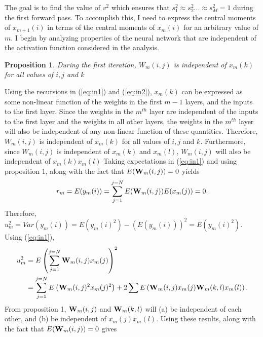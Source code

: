 \documentclass[a4paper]{article}
\newcommand{\enum}[1]{\label{eq:#1}}
\newcommand{\eref}[1]{(\ref {eq:#1})}
\newcommand{\be}{\begin{equation}}
\newcommand{\ee}{\end{equation}}
\newtheorem{prop}{Proposition}
\begin{document}
The goal is to find the value of $v^{2}$  which ensures that $s_{1}^{2} \approx s_{2}^{2} ...\approx s_{M}^{2} = 1$ during the first forward pass. To accomplish this, I need to express the  central moments of $x_{m+1}(i)$ in terms of the central moments of $x_{m}(i)$ for an arbitrary value of $m$. I begin by analyzing properties of the neural network that are independent of the activation function considered in the analysis.
\begin{prop}
During the first iteration, $W_{m}(i,j)$ is independent of $x_{m}(k)$ for all values of $i, j$ and $k$ 
\end{prop}
Using the recursions in \eref{in1} and \eref{in2}, $x_{m}(k)$ can be expressed as some non-linear function of the weights in the first $m-1$ layers, and the inputs to the first layer. Since the weights in the $m^{th}$ layer are independent of the inputs to the first layer and the weights in all other layers, the weights in the $m^{th}$ layer will also be independent of any non-linear function of these quantities. Therefore, $W_{m}(i,j)$ is independent of $x_{m}(k)$ for all values of $i, j$ and $k$. Furthermore, since $W_{m}(i,j)$ is independent of $x_{m}(k)$ and $x_{m}(l)$, $W_{m}(i,j)$ will also be independent of $x_{m}(k)x_{m}(l)$\qedsymbol
\linebreak
\newline
Taking expectations in \eref{in1} and using proposition 1, along with the fact that $E({\bf{W}}_{m}(i,j)) = 0$ yields 
\be 
r_{m} = E(y_{m}(i)) = \sum\limits_{j=1}^{j=N} E({\bf{W}}_{m}(i,j))E(x_{m}(j)) = 0. \enum{in201}
\ee 
Therefore,  $u_{m}^{2} = Var(y_{m}(i)) = E\left(y_{m}(i)^{2}\right) -  \left(E(y_{m}(i))\right)^{2} = E\left(y_{m}(i)^{2}\right)$. Using \eref{in1},
\be 
\begin{split}
u_{m}^{2} &= E\left(\sum\limits_{j=1}^{j=N}{\bf{W}}_{m}(i,j)x_{m}(j)\right)^{2} \\
&= \sum\limits_{j=1}^{j=N} E\left({\bf{W}}_{m}(i,j)^{2}x_{m}(j)^{2}\right)  + 2\sum E\left({\bf{W}}_{m}(i,j)x_{m}(j){\bf{W}}_{m}(k,l)x_{m}(l)\right). \\ \enum{in203}
\end{split}
\ee 
From proposition 1, ${\bf{W}}_{m}(i,j)$ and ${\bf{W}}_{m}(k,l)$ will (a) be independent of each other, and (b) be independent of $x_{m}(j)x_{m}(l)$. Using these results, along with the fact that $E({\bf{W}}_{m}(i,j)) = 0 $ gives 
\end{document}
